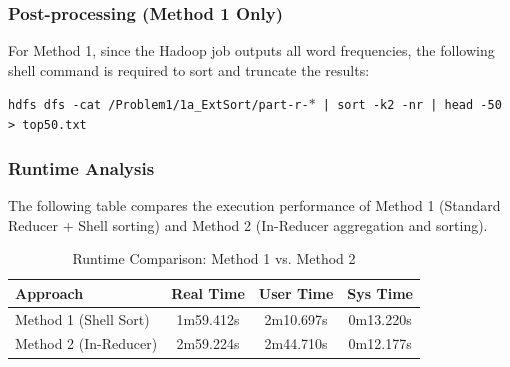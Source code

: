 \documentclass[12pt,a4paper]{article}
\begin{document}
\subsubsection{Post-processing (Method 1 Only)}

For Method 1, since the Hadoop job outputs all word frequencies, the following shell command is required to sort and truncate the results:

\begin{tcolorbox}[title=Post-processing command for Method 1, colback=black!5!white, colframe=black]
\texttt{hdfs dfs -cat /Problem1/1a\_ExtSort/part-r-$*$ | sort -k2 -nr | head -50 > top50.txt}
\end{tcolorbox}

\subsubsection{Runtime Analysis}

The following table compares the execution performance of Method 1 (Standard Reducer + Shell sorting) and Method 2 (In-Reducer aggregation and sorting).

\begin{table}[H]
  \centering
  \caption{Runtime Comparison: Method 1 vs. Method 2}
  \renewcommand{\arraystretch}{1.4}
  \begin{tabular}{l ccc}
    \toprule
    \rowcolor{lightblue}
    \textbf{Approach} & \textbf{Real Time} & \textbf{User Time} & \textbf{Sys Time} \\
    \midrule
    Method 1 (Shell Sort) & 1m59.412s & 2m10.697s & 0m13.220s \\
    Method 2 (In-Reducer) & 2m59.224s & 2m44.710s & 0m12.177s \\
    \bottomrule
  \end{tabular}
\end{table}
\end{document}
